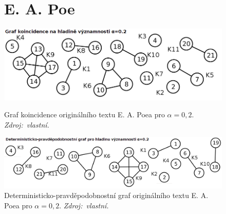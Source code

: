 \documentclass[dp.tex]{subfiles}
\begin{document}
\begin{figure}[h]
\section*{E. A. Poe}
	\centering
	\includegraphics[max width=\textwidth,keepaspectratio=true]{imgs-99-priloha-d/aa_k_20}
	\caption[Graf koincidence originálního textu E. A. Poea pro $\alpha = 0{,}2$]{Graf koincidence originálního textu E. A. Poea pro $\alpha = 0{,}2$. \textit{Zdroj:~vlastní.}}
	\label{fig:aa_k_20}

	\includegraphics[max width=\textwidth,keepaspectratio=true]{imgs-99-priloha-d/aa_d_21}
	\caption[Deterministicko-pravděpodobnostní graf originálního textu E. A. Poea pro $\alpha = 0{,}2$] {Deterministicko-pravděpodobnostní graf originálního textu E. A. Poea pro $\alpha = 0{,}2$. \textit{Zdroj:~vlastní.}}
	\label{fig:aa_d_20}
\end{figure}
\end{document}
